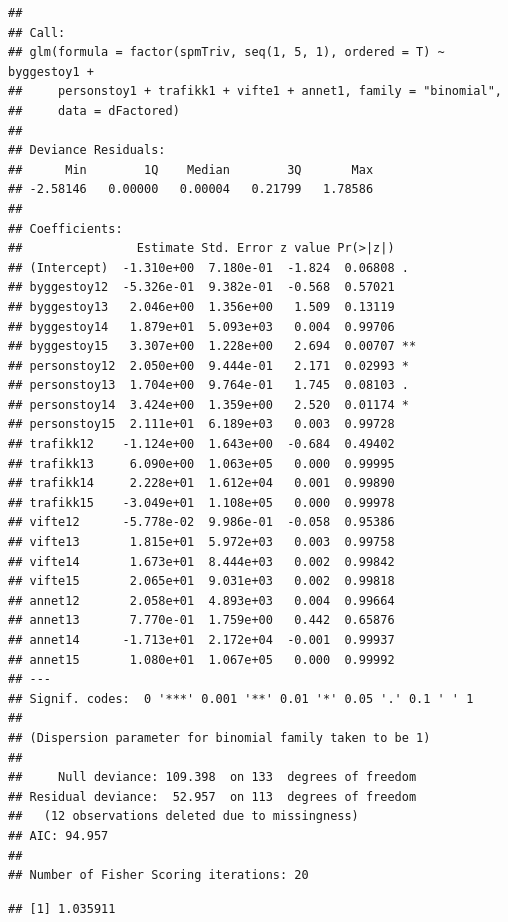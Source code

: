 \documentclass[
]{article}
\newenvironment{Shaded}{\begin{snugshade}}{\end{snugshade}}
\newcommand{\FunctionTok}[1]{\textcolor[rgb]{0.00,0.00,0.00}{#1}}
\newcommand{\NormalTok}[1]{#1}
\newcommand{\SpecialCharTok}[1]{\textcolor[rgb]{0.00,0.00,0.00}{#1}}
\begin{document}
\begin{verbatim}
## 
## Call:
## glm(formula = factor(spmTriv, seq(1, 5, 1), ordered = T) ~ byggestoy1 + 
##     personstoy1 + trafikk1 + vifte1 + annet1, family = "binomial", 
##     data = dFactored)
## 
## Deviance Residuals: 
##      Min        1Q    Median        3Q       Max  
## -2.58146   0.00000   0.00004   0.21799   1.78586  
## 
## Coefficients:
##                Estimate Std. Error z value Pr(>|z|)   
## (Intercept)  -1.310e+00  7.180e-01  -1.824  0.06808 . 
## byggestoy12  -5.326e-01  9.382e-01  -0.568  0.57021   
## byggestoy13   2.046e+00  1.356e+00   1.509  0.13119   
## byggestoy14   1.879e+01  5.093e+03   0.004  0.99706   
## byggestoy15   3.307e+00  1.228e+00   2.694  0.00707 **
## personstoy12  2.050e+00  9.444e-01   2.171  0.02993 * 
## personstoy13  1.704e+00  9.764e-01   1.745  0.08103 . 
## personstoy14  3.424e+00  1.359e+00   2.520  0.01174 * 
## personstoy15  2.111e+01  6.189e+03   0.003  0.99728   
## trafikk12    -1.124e+00  1.643e+00  -0.684  0.49402   
## trafikk13     6.090e+00  1.063e+05   0.000  0.99995   
## trafikk14     2.228e+01  1.612e+04   0.001  0.99890   
## trafikk15    -3.049e+01  1.108e+05   0.000  0.99978   
## vifte12      -5.778e-02  9.986e-01  -0.058  0.95386   
## vifte13       1.815e+01  5.972e+03   0.003  0.99758   
## vifte14       1.673e+01  8.444e+03   0.002  0.99842   
## vifte15       2.065e+01  9.031e+03   0.002  0.99818   
## annet12       2.058e+01  4.893e+03   0.004  0.99664   
## annet13       7.770e-01  1.759e+00   0.442  0.65876   
## annet14      -1.713e+01  2.172e+04  -0.001  0.99937   
## annet15       1.080e+01  1.067e+05   0.000  0.99992   
## ---
## Signif. codes:  0 '***' 0.001 '**' 0.01 '*' 0.05 '.' 0.1 ' ' 1
## 
## (Dispersion parameter for binomial family taken to be 1)
## 
##     Null deviance: 109.398  on 133  degrees of freedom
## Residual deviance:  52.957  on 113  degrees of freedom
##   (12 observations deleted due to missingness)
## AIC: 94.957
## 
## Number of Fisher Scoring iterations: 20
\end{verbatim}

\begin{Shaded}
\end{Shaded}

\begin{verbatim}
## [1] 1.035911
\end{verbatim}
\end{document}
